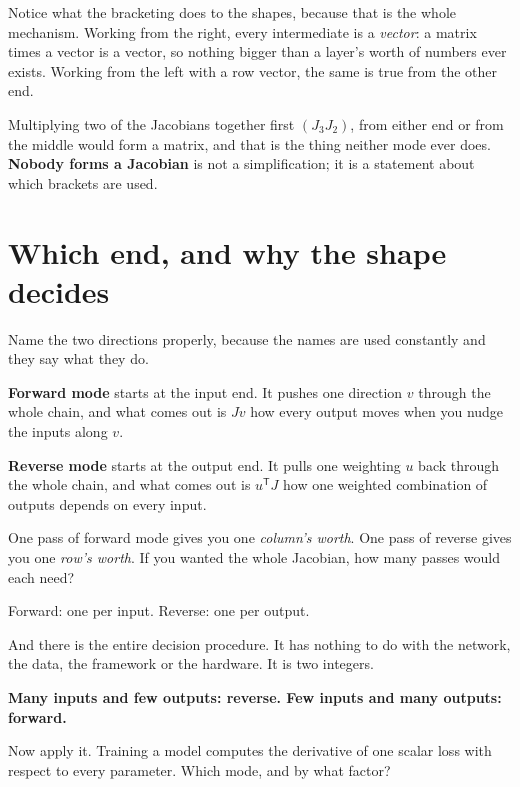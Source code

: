 \begin{fr}
\begin{note}
Notice what the bracketing does to the shapes, because that is the whole
mechanism. Working from the right, every intermediate is a \emph{vector}: a
matrix times a vector is a vector, so nothing bigger than a layer's worth of
numbers ever exists. Working from the left with a row vector, the same is true
from the other end.

Multiplying two of the Jacobians together first \dash{} $(J_3J_2)$, from
either end or from the middle \dash{} would form a matrix, and that is the
thing neither mode ever does. \textbf{Nobody forms a Jacobian} is not a
simplification; it is a statement about which brackets are used.
\end{note}
\end{fr}

\section{Which end, and why the shape decides}
\label{sec:P16-modes}

\begin{fr}
Name the two directions properly, because the names are used constantly and
they say what they do.

\textbf{Forward mode} starts at the input end. It pushes one direction $v$
through the whole chain, and what comes out is $Jv$ \dash{} how every output
moves when you nudge the inputs along $v$.

\textbf{Reverse mode} starts at the output end. It pulls one weighting $u$
back through the whole chain, and what comes out is $u^{\mathsf{T}}J$ \dash{}
how one weighted combination of outputs depends on every input.

One pass of forward mode gives you one \emph{column's worth}. One pass of
reverse gives you one \emph{row's worth}. If you wanted the whole Jacobian, how
many passes would each need?
\dotline
\nextframe
\end{fr}

\begin{fr}
\begin{ansblock}
Forward: one per input. Reverse: one per output.
\end{ansblock}

And there is the entire decision procedure. It has nothing to do with the
network, the data, the framework or the hardware. It is two integers.

\textbf{Many inputs and few outputs: reverse. Few inputs and many outputs:
forward.}

Now apply it. Training a model computes the derivative of one scalar loss with
respect to every parameter. Which mode, and by what factor?
\nextframe
\end{fr}

